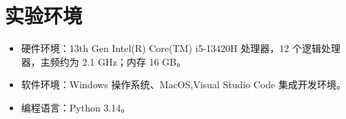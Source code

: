 \section{实验环境}
\begin{itemize}
    \item 硬件环境：13th Gen Intel(R) Core(TM) i5-13420H 处理器，12 个逻辑处理器，主频约为 2.1 GHz；内存 16 GB。
    \item 软件环境：Windows 操作系统、MacOS,Visual Studio Code 集成开发环境。
    \item 编程语言：Python 3.14。
\end{itemize}